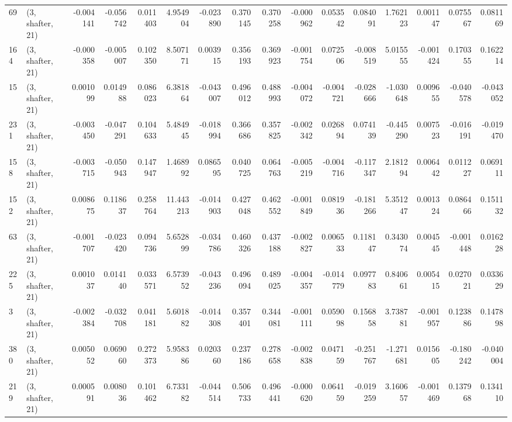 \begin{tabular}{llrrrrrrrrrrrrrr}
69  &  (3, shafter, 21) &  -0.004141 & -0.056742 &  0.011403 &    4.954904 & -0.023890 &   0.370145 &  0.370258 & -0.000962 &  0.053542 &  0.084091 &    1.762123 &  0.001147 &  0.075567 &  0.081169 \\
164 &  (3, shafter, 21) &  -0.000358 & -0.005007 &  0.102350 &    8.507171 &  0.003915 &   0.356193 &  0.369923 & -0.001754 &  0.072506 & -0.008519 &    5.015555 & -0.001424 &  0.170355 &  0.162214 \\
15  &  (3, shafter, 21) &   0.001099 &  0.014988 &  0.086023 &    6.381864 & -0.043007 &   0.496012 &  0.488993 & -0.004072 & -0.004721 & -0.028666 &   -1.030648 &  0.009655 & -0.040578 & -0.043052 \\
231 &  (3, shafter, 21) &  -0.003450 & -0.047291 &  0.104633 &    5.484945 & -0.018994 &   0.366686 &  0.357825 & -0.002342 &  0.026894 &  0.074139 &   -0.445290 &  0.007523 & -0.016191 & -0.019470 \\
158 &  (3, shafter, 21) &  -0.003715 & -0.050943 &  0.147947 &    1.468992 &  0.086595 &   0.040725 &  0.064763 & -0.005219 & -0.004716 & -0.117347 &    2.181294 &  0.006442 &  0.011227 &  0.069111 \\
152 &  (3, shafter, 21) &   0.008675 &  0.118637 &  0.258764 &   11.443213 & -0.014903 &   0.427048 &  0.462552 & -0.001849 &  0.081936 & -0.181266 &    5.351247 &  0.001324 &  0.086466 &  0.151132 \\
63  &  (3, shafter, 21) &  -0.001707 & -0.023420 &  0.094736 &    5.652899 & -0.034786 &   0.460326 &  0.437188 & -0.002827 &  0.006533 &  0.118147 &    0.343074 &  0.004545 & -0.001448 &  0.016228 \\
225 &  (3, shafter, 21) &   0.001037 &  0.014140 &  0.033571 &    6.573952 & -0.043236 &   0.496094 &  0.489025 & -0.004357 & -0.014779 &  0.097783 &    0.840661 &  0.005415 &  0.027021 &  0.033629 \\
3   &  (3, shafter, 21) &  -0.002384 & -0.032708 &  0.041181 &    5.601882 & -0.014308 &   0.357401 &  0.344081 & -0.001111 &  0.059098 &  0.156858 &    3.738781 & -0.001957 &  0.123886 &  0.147898 \\
380 &  (3, shafter, 21) &   0.005052 &  0.069060 &  0.272373 &    5.958386 &  0.020360 &   0.237186 &  0.278658 & -0.002838 &  0.047159 & -0.251767 &   -1.271681 &  0.015605 & -0.180242 & -0.040004 \\
219 &  (3, shafter, 21) &   0.000591 &  0.008036 &  0.101462 &    6.733182 & -0.044514 &   0.506733 &  0.496441 & -0.000620 &  0.064159 & -0.019259 &    3.160657 & -0.001469 &  0.137968 &  0.134110 \\

\end{tabular}

